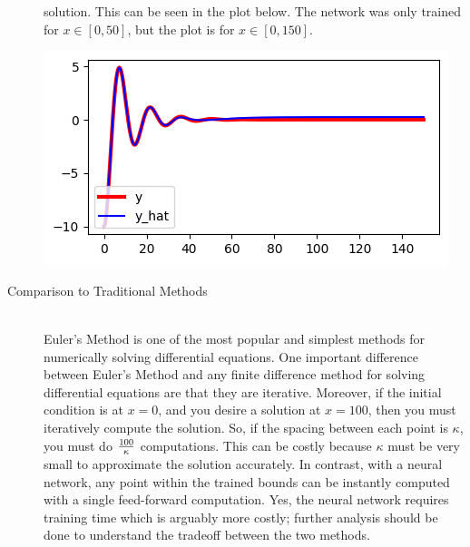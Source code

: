 \documentclass[12pt]{article}
\begin{document}
\begin{description}
    solution. This can be seen in the plot below. The network was only trained
    for $x\in[0, 50]$, but the plot is for $x\in[0, 150]$. \\
    \begin{minipage}{\linewidth}
        \centering
        \includegraphics[scale=.5]{images/figure17.png}
    \end{minipage}
    \item[Comparison to Traditional Methods] \hfill \\
    Euler's Method is one of the most popular and simplest methods for
    numerically solving differential equations. One important difference
    between Euler's Method and any finite difference method for solving
    differential equations are that they are iterative. Moreover, if the
    initial condition is at $x=0$, and you desire a solution at $x=100$, then
    you must iteratively compute the solution. So, if the spacing between each
    point is $\kappa$, you must do $100\over\kappa$ computations. This can be
    costly because $\kappa$ must be very small to approximate the solution
    accurately. In contrast, with a neural network, any point within the
    trained bounds can be instantly computed with a single feed-forward
    computation. Yes, the neural network requires training time which is
    arguably more costly; further analysis should be done to understand the
    tradeoff between the two methods.


\end{description}
\end{document}
